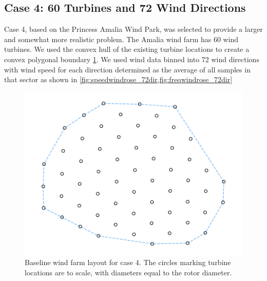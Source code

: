 \documentclass{jpconf}
\begin{document}
\subsection{Case 4: 60 Turbines and 72 Wind Directions}
Case 4, based on the Princess Amalia Wind Park, was selected to provide a larger and somewhat more realistic problem. The Amalia wind farm has 60 wind turbines. We used the convex hull of the existing turbine locations to create a convex polygonal boundary \cref{fig:layout4}. We used wind data binned into 72 wind directions with wind speed for each direction determined as the average of all samples in that sector as shown in \cref{fig:speedwindrose_72dir,fig:freqwindrose_72dir}
\begin{figure}[h!]
	\centering
	\begin{minipage}[t]{18pc}
		\centering
		\includegraphics[width=1.\textwidth, trim={1.0cm, 0cm, 1.0cm, 0cm}, clip]{final_images/layouts/60_turb_start.pdf}
		\caption{Baseline wind farm layout for case 4. The circles marking turbine locations are to scale, with diameters equal to the rotor diameter.}
		\label{fig:layout4}
	\end{minipage}\hspace{1pc}%
\end{figure}
\end{document}
